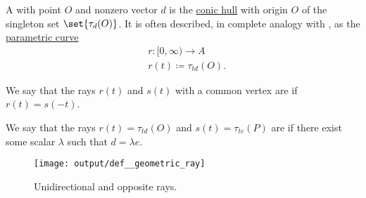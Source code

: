 \begin{definition}\label{def:geometric_ray}\mimprovised
  A  with  point \( O \) and nonzero  vector \( d \) is the \hyperref[def:conic_hull]{conic hull} with origin \( O \) of the singleton set \( \set{ \tau_d(O) } \). It is often described, in complete analogy with , as the \hyperref[def:parametric_curve]{parametric curve}
  \begin{equation*}
    \begin{aligned}
       &r: [0, \infty) \to A \\
       &r(t) \coloneqq \tau_{td}(O).
    \end{aligned}
  \end{equation*}

  \begin{thmenum}
     We say that the rays \( r(t) \) and \( s(t) \) with a common vertex are  if \( r(t) = s(-t) \).

     We say that the rays \( r(t) = \tau_{t d}(O) \) and \( s(t) = \tau_{t e}(P) \) are  if there exist some  scalar \( \lambda \) such that \( d = \lambda e \).
  \end{thmenum}

  \begin{figure}[!ht]
    \centering
    \texttt{[image: output/def\_\_geometric\_ray]}
    \caption{Unidirectional and opposite rays.}\label{fig:def:geometric_ray}
  \end{figure}
\end{definition}

